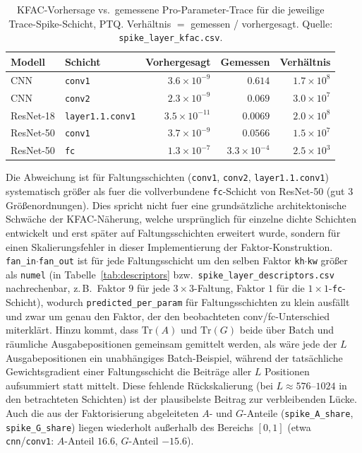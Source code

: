 \begin{table}[t]
\centering
\small
\caption{KFAC-Vorhersage vs.\ gemessene Pro-Parameter-Trace für die jeweilige Trace-Spike-Schicht, PTQ. Verhältnis $=$ gemessen / vorhergesagt. Quelle: \texttt{spike\_layer\_kfac.csv}.}
\label{tab:kfac}
\begin{tabular}{llrrr}
\toprule
Modell & Schicht & Vorhergesagt & Gemessen & Verhältnis \\
\midrule
CNN & \texttt{conv1} & $3.6\times10^{-9}$ & $0.614$ & $1.7\times10^{8}$ \\
CNN & \texttt{conv2} & $2.3\times10^{-9}$ & $0.069$ & $3.0\times10^{7}$ \\
ResNet-18 & \texttt{layer1.1.conv1} & $3.5\times10^{-11}$ & $0.0069$ & $2.0\times10^{8}$ \\
ResNet-50 & \texttt{conv1} & $3.7\times10^{-9}$ & $0.0566$ & $1.5\times10^{7}$ \\
ResNet-50 & \texttt{fc} & $1.3\times10^{-7}$ & $3.3\times10^{-4}$ & $2.5\times10^{3}$ \\
\bottomrule
\end{tabular}
\end{table}

Die Abweichung ist für Faltungsschichten (\texttt{conv1}, \texttt{conv2}, \texttt{layer1.1.conv1}) systematisch größer als fuer die vollverbundene \texttt{fc}-Schicht von ResNet-50 (gut 3 Größenordnungen). Dies spricht nicht fuer eine grundsätzliche architektonische Schwäche der KFAC-Näherung, welche ursprünglich für einzelne dichte Schichten entwickelt \citep{martens_kfac_2015} und erst später auf Faltungsschichten erweitert \citep{grosse_kfc_2016} wurde, sondern für einen Skalierungsfehler in dieser Implementierung der Faktor-Konstruktion. \texttt{fan\_in}$\cdot$\texttt{fan\_out} ist für jede Faltungsschicht um den selben Faktor \texttt{kh}$\cdot$\texttt{kw} größer als \texttt{numel} (in Tabelle~\ref{tab:descriptors} bzw.\ \texttt{spike\_layer\_descriptors.csv} nachrechenbar, z.\,B.\ Faktor $9$ für jede $3\times3$-Faltung, Faktor $1$ für die $1\times1$-\texttt{fc}-Schicht), wodurch \texttt{predicted\_per\_param} für Faltungsschichten zu klein ausfällt und zwar um genau den Faktor, der den beobachteten conv/fc-Unterschied miterklärt. Hinzu kommt, dass $\mathrm{Tr}(A)$ und $\mathrm{Tr}(G)$ beide über Batch und räumliche Ausgabepositionen gemeinsam gemittelt werden, als wäre jede der $L$ Ausgabepositionen ein unabhängiges Batch-Beispiel, während der tatsächliche Gewichtsgradient einer Faltungsschicht die Beiträge aller $L$ Positionen aufsummiert statt mittelt. Diese fehlende Rückskalierung (bei $L\approx 576$--$1024$ in den betrachteten Schichten) ist der plausibelste Beitrag zur verbleibenden Lücke. Auch die aus der Faktorisierung abgeleiteten $A$- und $G$-Anteile (\texttt{spike\_A\_share}, \texttt{spike\_G\_share}) liegen wiederholt außerhalb des Bereichs $[0,1]$ (etwa \texttt{cnn}/\texttt{conv1}: $A$-Anteil $16.6$, $G$-Anteil $-15.6$).

